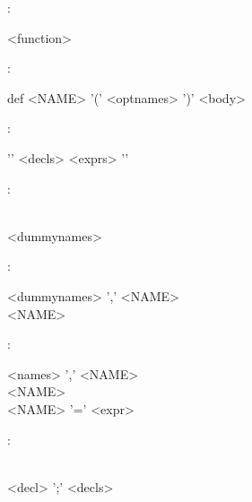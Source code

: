 \documentclass[12pt]{article}
\newcommand{\bs}[2]{%
\begin{minipage}{5in}%
\begin{syntdiag*}[\left{#1}\right{#2}][5in]%
}
\newcommand{\es}{\end{syntdiag*}\end{minipage}}
\begin{document}
\begin{framed}
:\\
\indent \bs {>>-} {-><} 
\begin{rep}<function>\\ \end{rep} 
\es
\end{framed}

\begin{framed}
: \\
\indent \bs {>>-} {-><} 
def <NAME> '(' <optnames>  ')' <body> 
\es
\end{framed}

\begin{framed}
: \\
\indent \bs {>>-} {-><}
'{' <decls> <exprs> '}'
\es
\end{framed}

\begin{framed}
:\\
\indent \bs {>>-} {-><} 
\begin{stack} 
	\\ 
	<dummynames> 
\end{stack} 
\es
\end{framed}

\begin{framed}
:\\
\indent \bs {>>-} {-><} 
\begin{stack} 
	<dummynames> ',' <NAME> \\ 
	<NAME>
\end{stack} 
\es
\end{framed}

\begin{framed}
:\\
\indent \bs {>>-} {-><} 
\begin{stack} 
	<names> ',' <NAME> \\ 
	<NAME> \\ 
	<NAME> '=' <expr> 
\end{stack} 
\es
\end{framed}

\begin{framed}
:\\
\indent \bs {>>-} {-><} 
\begin{stack} 
	\\ 
	<decl> ';' <decls> 
\end{stack} 
\es
\end{framed}
\end{document}

